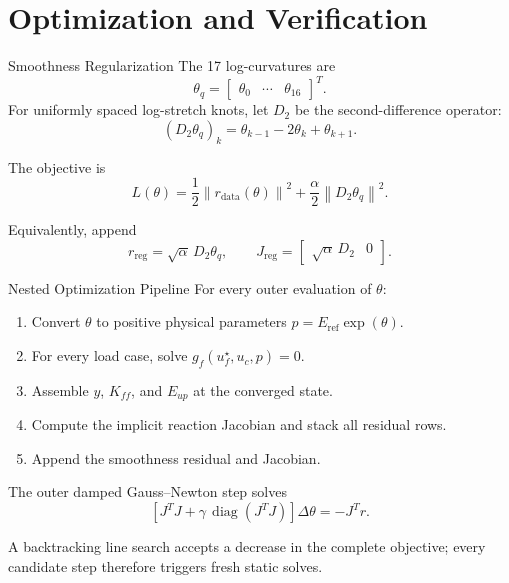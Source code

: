 \documentclass[aspectratio=169,10pt]{beamer}
\newcommand{\norm}[1]{\left\lVert #1\right\rVert}
\newcommand{\eref}{E_{\mathrm{ref}}}
\newcommand{\Kff}{K_{\!ff}}
\newcommand{\Eup}{E_{up}}
\begin{document}
\section{Optimization and Verification}

\begin{frame}{Smoothness Regularization}
  \small
  The 17 log-curvatures are
  \[
    \theta_q=
    \begin{bmatrix}\theta_0&\cdots&\theta_{16}\end{bmatrix}^{T}.
  \]
  For uniformly spaced log-stretch knots, let $D_2$ be the second-difference
  operator:
  \[
    (D_2\theta_q)_k
    =
    \theta_{k-1}-2\theta_k+\theta_{k+1}.
  \]

  The objective is
  \[
    L(\theta)
    =
    \frac12\norm{r_{\mathrm{data}}(\theta)}^2
    +
    \frac{\alpha}{2}\norm{D_2\theta_q}^2.
  \]

  Equivalently, append
  \[
    r_{\mathrm{reg}}=\sqrt{\alpha}\,D_2\theta_q,
    \qquad
    J_{\mathrm{reg}}
    =
    \begin{bmatrix}\sqrt{\alpha}\,D_2&0\end{bmatrix}.
  \]
\end{frame}

\begin{frame}{Nested Optimization Pipeline}
  \small
  For every outer evaluation of $\theta$:
  \begin{enumerate}
    \item Convert $\theta$ to positive physical parameters
      $p=\eref\exp(\theta)$.
    \item For every load case, solve
      $g_f(u_f^\star,u_c,p)=0$.
    \item Assemble $y$, $\Kff$, and $\Eup$ at the converged state.
    \item Compute the implicit reaction Jacobian and stack all residual rows.
    \item Append the smoothness residual and Jacobian.
  \end{enumerate}

  The outer damped Gauss--Newton step solves
  \[
    \left[J^TJ+\gamma\,\operatorname{diag}(J^TJ)\right]\Delta\theta
    =
    -J^Tr.
  \]

  A backtracking line search accepts a decrease in the complete objective;
  every candidate step therefore triggers fresh static solves.
\end{frame}
\end{document}
